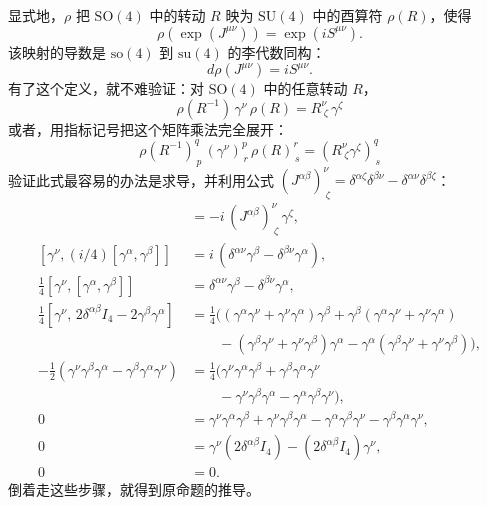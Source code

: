显式地，$\rho$ 把 $\mathrm{SO}(4)$ 中的转动 $R$ 映为 $\mathrm{SU}(4)$ 中的酉算符 $\rho(R)$，使得
\begin{equation}
\rho(\exp(J^{\mu\nu}))=\exp(iS^{\mu\nu}).
\end{equation}
该映射的导数是 $\mathrm{so}(4)$ 到 $\mathrm{su}(4)$ 的李代数同构：
\begin{equation}
d\rho(J^{\mu\nu})=iS^{\mu\nu}.
\end{equation}
有了这个定义，就不难验证：对 $\mathrm{SO}(4)$ 中的任意转动 $R$，
\begin{equation}
\rho(R^{-1})\,\gamma^{\nu}\,\rho(R)=R^{\nu}_{\ \zeta}\,\gamma^{\zeta} \tag{1}
\end{equation}
或者，用指标记号把这个矩阵乘法完全展开：
\begin{equation}
\rho(R^{-1})^{q}_{\,p}\,(\gamma^{\nu})^{p}_{\,r}\,\rho(R)^{r}_{\,s}
=(R^{\nu}_{\ \zeta}\gamma^{\zeta})^{q}_{\,s} \tag{2}
\end{equation}
验证此式最容易的办法是求导，并利用公式 $(J^{\alpha\beta})^{\nu}_{\ \zeta}=\delta^{\alpha\zeta}\delta^{\beta\nu}-\delta^{\alpha\nu}\delta^{\beta\zeta}$：
\begin{align*}
[\gamma^{\nu},S^{\alpha\beta}] &= -i\,(J^{\alpha\beta})^{\nu}_{\ \zeta}\,\gamma^{\zeta},\\
[\gamma^{\nu},(i/4)[\gamma^{\alpha},\gamma^{\beta}]] &= i\,(\delta^{\alpha\nu}\gamma^{\beta}-\delta^{\beta\nu}\gamma^{\alpha}),\\
\tfrac14[\gamma^{\nu},[\gamma^{\alpha},\gamma^{\beta}]] &= \delta^{\alpha\nu}\gamma^{\beta}-\delta^{\beta\nu}\gamma^{\alpha},\\
\tfrac14[\gamma^{\nu},\,2\delta^{\alpha\beta}I_{4}-2\gamma^{\beta}\gamma^{\alpha}]
&= \tfrac14\bigl((\gamma^{\alpha}\gamma^{\nu}+\gamma^{\nu}\gamma^{\alpha})\gamma^{\beta}
+\gamma^{\beta}(\gamma^{\alpha}\gamma^{\nu}+\gamma^{\nu}\gamma^{\alpha})\\
&\qquad-(\gamma^{\beta}\gamma^{\nu}+\gamma^{\nu}\gamma^{\beta})\gamma^{\alpha}
-\gamma^{\alpha}(\gamma^{\beta}\gamma^{\nu}+\gamma^{\nu}\gamma^{\beta})\bigr),\\
-\tfrac12(\gamma^{\nu}\gamma^{\beta}\gamma^{\alpha}-\gamma^{\beta}\gamma^{\alpha}\gamma^{\nu})
&= \tfrac14\bigl(\gamma^{\nu}\gamma^{\alpha}\gamma^{\beta}
+\gamma^{\beta}\gamma^{\alpha}\gamma^{\nu}\\
&\qquad-\gamma^{\nu}\gamma^{\beta}\gamma^{\alpha}
-\gamma^{\alpha}\gamma^{\beta}\gamma^{\nu}\bigr),\\
0 &= \gamma^{\nu}\gamma^{\alpha}\gamma^{\beta}
+\gamma^{\nu}\gamma^{\beta}\gamma^{\alpha}
-\gamma^{\alpha}\gamma^{\beta}\gamma^{\nu}
-\gamma^{\beta}\gamma^{\alpha}\gamma^{\nu},\\
0 &= \gamma^{\nu}(2\delta^{\alpha\beta}I_{4})-(2\delta^{\alpha\beta}I_{4})\gamma^{\nu},\\
0 &= 0 .
\end{align*}
倒着走这些步骤，就得到原命题的推导。

